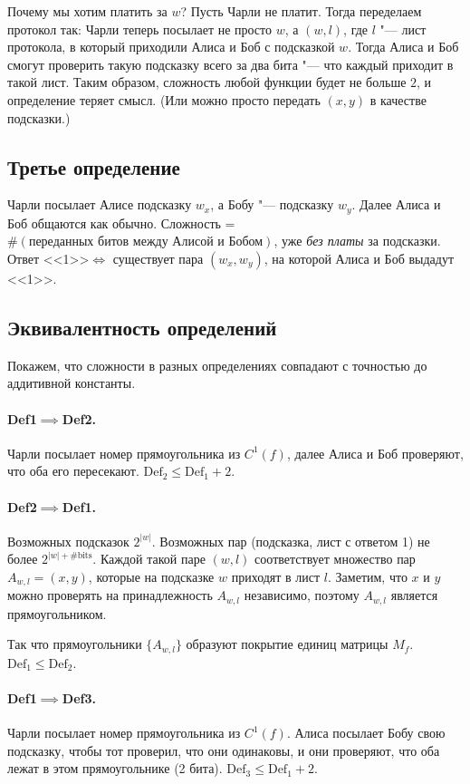 Почему мы хотим платить за $w$?
Пусть Чарли не платит. Тогда переделаем протокол так: Чарли теперь посылает не просто $w$, а $(w, l)$, где $l$ "--- лист протокола, в который приходили Алиса и Боб с подсказкой $w$. Тогда Алиса и Боб смогут проверить такую подсказку всего за два бита "--- что каждый приходит в такой лист. Таким образом, сложность любой функции будет не больше $2$, и определение теряет смысл.
(Или можно просто передать $(x, y)$ в качестве подсказки.)

\subsection{Третье определение}
Чарли посылает Алисе подсказку $w_x$, а Бобу "--- подсказку $w_y$. Далее Алиса и Боб общаются как обычно.
Сложность = $\#(\text{переданных битов между Алисой и Бобом})$, уже \emph{без платы} за подсказки.
Ответ <<1>>$\iff$ существует пара $(w_x, w_y)$, на которой Алиса и Боб выдадут <<1>>.

\subsection{Эквивалентность определений}
Покажем, что сложности в разных определениях совпадают с точностью до аддитивной константы.

\paragraph{Def1$\implies$Def2.}
Чарли посылает номер прямоугольника из $C^1(f)$, далее Алиса и Боб проверяют, что оба его пересекают. $\mathrm{Def}_2 \leqslant \mathrm{Def}_1 + 2$.

\paragraph{Def2$\implies$Def1.}
Возможных подсказок $2^{|w|}$.
Возможных пар (подсказка, лист с ответом 1) не более $2^{|w|+\#\text{bits}}$.
Каждой такой паре $(w, l)$ соответствует множество пар $A_{w,l} = (x, y)$, которые на подсказке $w$ приходят в лист $l$.
Заметим, что $x$ и $y$ можно проверять на принадлежность $A_{w, l}$ независимо, поэтому $A_{w,l}$ является прямоугольником.

Так что прямоугольники $\{A_{w, l}\}$ образуют покрытие единиц матрицы $M_f$.
$\mathrm{Def}_1 \leqslant \mathrm{Def}_2$.

\paragraph{Def1$\implies$Def3.}
Чарли посылает номер прямоугольника из $C^1(f)$. Алиса посылает Бобу свою подсказку, чтобы тот проверил, что они одинаковы, и они проверяют, что оба лежат в этом прямоугольнике (2 бита).
$\mathrm{Def}_3 \leqslant \mathrm{Def}_1 + 2$.

